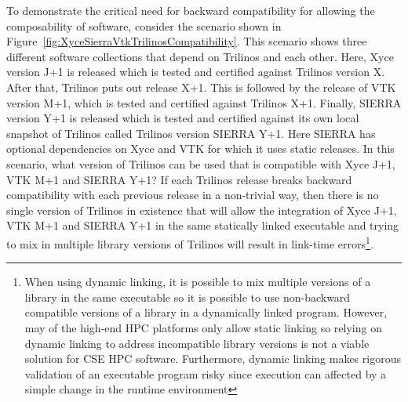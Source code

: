 \documentclass[11pt]{SANDreport}
\begin{document}
To demonstrate the critical need for backward compatibility for allowing the composability of software, consider the scenario shown in Figure~\ref{fig:XyceSierraVtkTrilinosCompatibility}.  This scenario shows three different software collections that depend on Trilinos and each other.  Here, Xyce version J+1 is released which is tested and certified against Trilinos version X.  After that, Trilinos puts out release X+1.  This is followed by the release of VTK version M+1, which is tested and certified against Trilinos X+1.  Finally, SIERRA version Y+1 is released which is tested and certified against its own local snapshot of Trilinos called Trilinos version SIERRA Y+1.  Here SIERRA has optional dependencies on Xyce and VTK for which it uses static releases.  In this scenario, what version of Trilinos can be used that is compatible with Xyce J+1, VTK M+1 and SIERRA Y+1?  If each Trilinos release breaks backward compatibility with each previous release in a non-trivial way, then there is no single version of Trilinos in existence that will allow the integration of Xyce J+1, VTK M+1 and SIERRA Y+1 in the same statically linked executable and trying to mix in multiple library versions of Trilinos will result in link-time errors\footnote{When using dynamic linking, it is possible to mix multiple versions of a library in the same executable so it is possible to use non-backward compatible versions of a library in a dynamically linked program.  However, may of the high-end HPC platforms only allow static linking so relying on dynamic linking to address incompatible library versions is not a viable solution for CSE HPC software.  Furthermore, dynamic linking makes rigorous validation of an executable program risky since execution can affected by a simple change in the runtime environment}.
\end{document}
